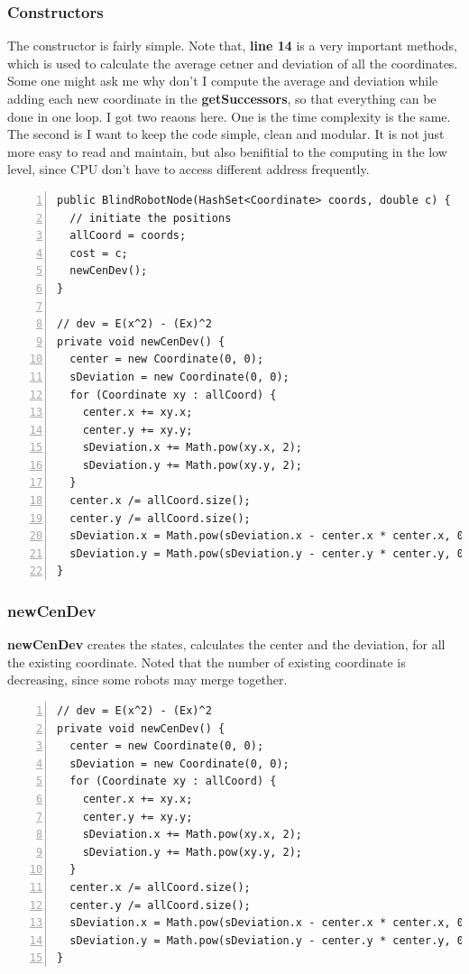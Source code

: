 \documentclass{article}
\begin{document}
\subsubsection{Constructors}
The constructor is fairly simple. Note that, \textbf{line 14} is a very important methods, which is used to calculate the average cetner and deviation of all the coordinates. Some one might ask me why don't I compute the average and deviation while adding each new coordinate in the \textbf{getSuccessors}, so that everything can be done in one loop.  I got two reaons here. One is the time complexity is the same. The second is I want to keep the code simple, clean and modular. It is not just more easy to read and maintain, but also benifitial to the computing in the low level, since CPU don't have to access different address frequently.
\begin{lstlisting}[numbers=left]
public BlindRobotNode(HashSet<Coordinate> coords, double c) {
  // initiate the positions
  allCoord = coords;
  cost = c;
  newCenDev();
}

// dev = E(x^2) - (Ex)^2
private void newCenDev() {
  center = new Coordinate(0, 0);
  sDeviation = new Coordinate(0, 0);
  for (Coordinate xy : allCoord) {
    center.x += xy.x;
    center.y += xy.y;
    sDeviation.x += Math.pow(xy.x, 2);
    sDeviation.y += Math.pow(xy.y, 2);
  }
  center.x /= allCoord.size();
  center.y /= allCoord.size();
  sDeviation.x = Math.pow(sDeviation.x - center.x * center.x, 0.5);
  sDeviation.y = Math.pow(sDeviation.y - center.y * center.y, 0.5);
}
\end{lstlisting}


\subsubsection{newCenDev}

\textbf{newCenDev} creates the states, calculates the center and the deviation, for all the existing coordinate. Noted that the number of existing coordinate is decreasing, since some robots may merge together.
\begin{lstlisting}[numbers=left]
// dev = E(x^2) - (Ex)^2
private void newCenDev() {
  center = new Coordinate(0, 0);
  sDeviation = new Coordinate(0, 0);
  for (Coordinate xy : allCoord) {
    center.x += xy.x;
    center.y += xy.y;
    sDeviation.x += Math.pow(xy.x, 2);
    sDeviation.y += Math.pow(xy.y, 2);
  }
  center.x /= allCoord.size();
  center.y /= allCoord.size();
  sDeviation.x = Math.pow(sDeviation.x - center.x * center.x, 0.5);
  sDeviation.y = Math.pow(sDeviation.y - center.y * center.y, 0.5);
}
\end{lstlisting}
\end{document}
